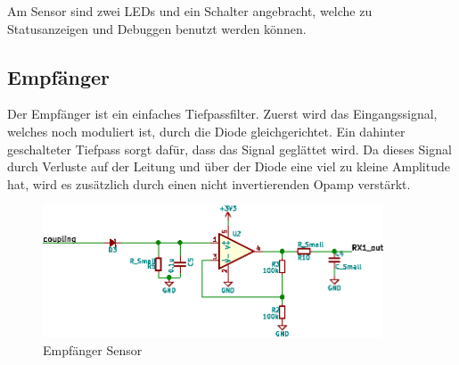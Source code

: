 Am Sensor sind zwei LEDs und ein Schalter angebracht, welche zu Statusanzeigen
und Debuggen benutzt werden k\"onnen.

\clearpage
\subsection{Empf\"anger}
\label{subsec:hw:sensor:receiver}

Der   Empf\"anger  ist   ein  einfaches   Tiefpassfilter.   Zuerst   wird  das
Eingangssignal,  welches  noch  moduliert   ist,  durch  die  Diode  
gleichgerichtet. Ein dahinter  geschalteter Tiefpass  sorgt daf\"ur,  dass das
Signal gegl\"attet wird. Da  dieses Signal durch Verluste auf  der Leitung und
\"uber der Diode eine viel zu kleine Amplitude hat, wird es zus\"atzlich durch
einen nicht invertierenden Opamp verst\"arkt.

\begin{figure}[h!t]
    \centering
    \includegraphics[width=0.9\textwidth]{images/sensor-sch/sensor--sch--receiver.eps}
    \caption[Sensor: Schema Empf\"anger]{Empf\"anger Sensor}
\end{figure}
